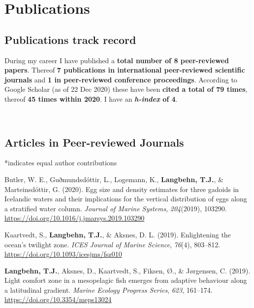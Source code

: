 \documentclass[11pt, a4paper]{awesome-cv}
\begin{document}
\hypertarget{publications}{%
\section{Publications}\label{publications}}

\hypertarget{publications-track-record}{%
\subsection{Publications track record}\label{publications-track-record}}

During my career I have published a \textbf{total number of 8
peer-reviewed papers}. Thereof \textbf{7 publications in international
peer-reviewed scientific journals} and \textbf{1 in peer-reviewed
conference proceedings}. According to Google Scholar (as of 22 Dec 2020)
these have been \textbf{cited a total of 79 times}, thereof \textbf{45
times within 2020}. I have an \textbf{\emph{h-index} of 4}.

~ ~

\hypertarget{articles-in-peer-reviewed-journals}{%
\subsection{Articles in Peer-reviewed
Journals}\label{articles-in-peer-reviewed-journals}}

*indicates equal author contributions

\begingroup
\setlength{\parindent}{-0.5in}
\setlength{\leftskip}{0.5in}

\hypertarget{refs_journals}{}
\leavevmode\hypertarget{ref-Butler2020}{}%
Butler, W. E., Guðmundsdóttir, L., Logemann, K.,
\textbf{Langbehn, T.J.}, \& Marteinsdóttir, G. (2020). Egg size and
density estimates for three gadoids in Icelandic waters and their
implications for the vertical distribution of eggs along a stratified
water column. \emph{Journal of Marine Systems}, \emph{204}(2019),
103290. \url{https://doi.org/10.1016/j.jmarsys.2019.103290}

\leavevmode\hypertarget{ref-Kaartvedt2019b}{}%
Kaartvedt, S., \textbf{Langbehn, T.J.}, \& Aksnes, D. L. (2019).
Enlightening the ocean's twilight zone. \emph{ICES Journal of Marine
Science}, \emph{76}(4), 803--812.
\url{https://doi.org/10.1093/icesjms/fsz010}

\leavevmode\hypertarget{ref-Langbehn2019a}{}%
\textbf{Langbehn, T.J.}, Aksnes, D., Kaartvedt, S., Fiksen, Ø., \&
Jørgensen, C. (2019). Light comfort zone in a mesopelagic fish emerges
from adaptive behaviour along a latitudinal gradient. \emph{Marine
Ecology Progress Series}, \emph{623}, 161--174.
\url{https://doi.org/10.3354/meps13024}
\end{document}
